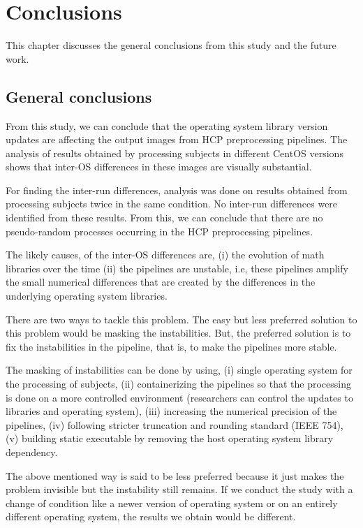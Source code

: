 \chapter{Conclusions}\label{conclusion}
This chapter discusses the general conclusions from this study and the future work.

\section{General conclusions}
From this study, we can conclude that the operating system library 
version updates are affecting the output images from HCP preprocessing 
pipelines. The analysis of results obtained by processing subjects in 
different CentOS versions shows that inter-OS differences in these 
images are visually substantial.

For finding the inter-run differences, analysis was done on results 
obtained from processing subjects twice in the same condition. No 
inter-run differences were identified from these results. From this, we 
can conclude that there are no pseudo-random processes occurring in the HCP preprocessing pipelines.

The likely causes, of the inter-OS differences are, (i) the evolution 
of math libraries over the time (ii) the pipelines are unstable, i.e, 
these pipelines amplify the small numerical differences that are 
created by the differences in the underlying operating system 
libraries.

There are two ways to tackle this problem. The easy but less preferred 
solution to this problem would be masking the instabilities. But, the 
preferred solution is to fix the instabilities in the pipeline, that 
is, to make the pipelines more stable.

The masking of instabilities can be done by using, (i) single operating 
system for the processing of subjects, (ii) containerizing the 
pipelines so that the processing is done on a more controlled 
environment (researchers can control the updates to libraries and 
operating system), (iii) increasing the numerical precision of the 
pipelines, (iv) following stricter truncation and rounding standard 
(IEEE 754), (v) building static executable by removing the host 
operating system library dependency.

The above mentioned way is said to be less preferred because it just 
makes the problem invisible but the instability still remains. If we 
conduct the study with a change of condition like a newer version of 
operating system or on an entirely different operating system, the 
results we obtain would be different.

